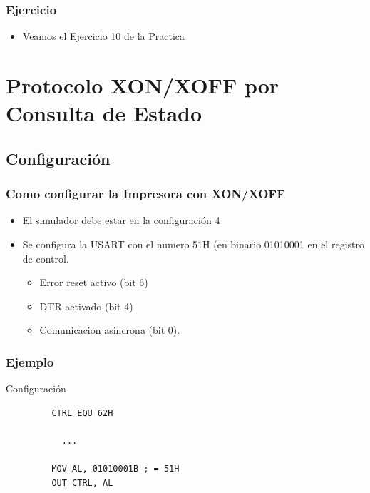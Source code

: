\documentclass{beamer}
\begin{document}
\begin{frame}[fragile]
\frametitle{Ejercicio}

\begin{itemize}
 \item Veamos el Ejercicio 10 de la Practica
\end{itemize}

\end{frame}

\section{Protocolo XON/XOFF por Consulta de Estado}

\subsection{Configuración}

\begin{frame}[fragile]
\frametitle{Como configurar la Impresora con XON/XOFF}
\begin{itemize}
 \item El simulador debe estar en la configuración 4
 \item Se configura la USART con el numero 51H (en binario 01010001 en el registro de control.
 \begin{itemize}
 \item Error reset activo (bit 6)
 \item DTR activado (bit 4)
 \item Comunicacion asincrona (bit 0). 
\end{itemize}

 \end{itemize}
\end{frame}

\begin{frame}[fragile]
\frametitle{Ejemplo}
\begin{block}{Configuración}
 \begin{verbatim}
         CTRL EQU 62H
         
           ...
           
         MOV AL, 01010001B ; = 51H
         OUT CTRL, AL
 \end{verbatim}
\end{block}

\end{frame}
\end{document}
